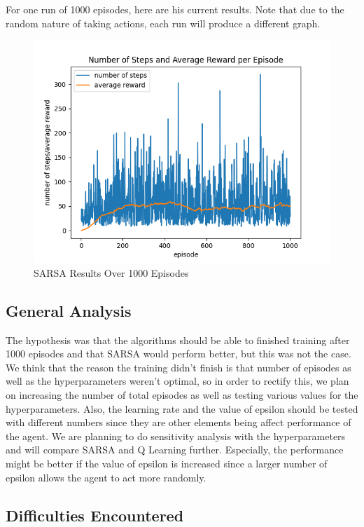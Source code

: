 \documentclass[nohyperref]{article}
\theoremstyle{plain}
\theoremstyle{definition}
\theoremstyle{remark}
\begin{document}
For one run of 1000 episodes, here are his current results. Note that due to the random nature of taking actions, each run will produce a different graph.

\begin{figure}[H] %
    \centering
    \includegraphics[width=1\linewidth]{sarsa-average-1k.png}
    \caption{SARSA Results Over 1000 Episodes}
\end{figure}

\subsection*{General Analysis}

The hypothesis was that the algorithms should be able to finished training after 1000 episodes and that SARSA would perform better, but this was not the case. 
We think that the reason the training didn't finish is that number of episodes as well as the hyperparameters weren't optimal, 
so in order to rectify this, we plan on increasing the number of total episodes as well as testing various values for the hyperparameters. 
Also, the learning rate and the value of epsilon should be tested with different numbers since they are other elements being affect performance of the agent. We are planning to do 
sensitivity analysis with the hyperparameters and will compare SARSA and Q Learning further.
Especially, the performance might be better if the value of epsilon is increased since a larger number of epsilon allows the agent to act more randomly.

\subsection*{Difficulties Encountered}
\end{document}
